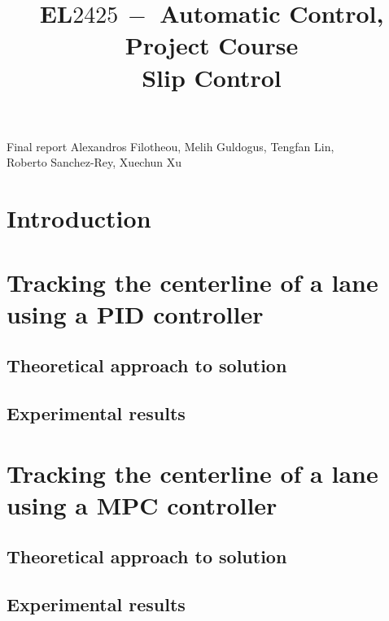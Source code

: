 \documentclass[a4paper,12pt,oneside,onecolumn]{article} %
\title{
	\vspace{1in}
  EL$2425\ -$ Automatic Control, Project Course \\
  \vspace{0.2in}
  Slip Control
}
\begin{document}
	\maketitle

  \vfill

  \begin{center}

    \large Final report
    \vfill
    Alexandros Filotheou, Melih Guldogus, Tengfan Lin,\\ Roberto Sanchez-Rey, Xuechun Xu
  \end{center}

  \newpage
  \tableofcontents
  \newpage

\section{Introduction}

  

  \newpage

  \section{Tracking the centerline of a lane using a PID controller}

    \subsection{Theoretical approach to solution}
      

    \subsection{Experimental results}
      

  \newpage

  \section{Tracking the centerline of a lane using a MPC controller}

    \subsection{Theoretical approach to solution}
      

    \subsection{Experimental results}
      
\end{document}
